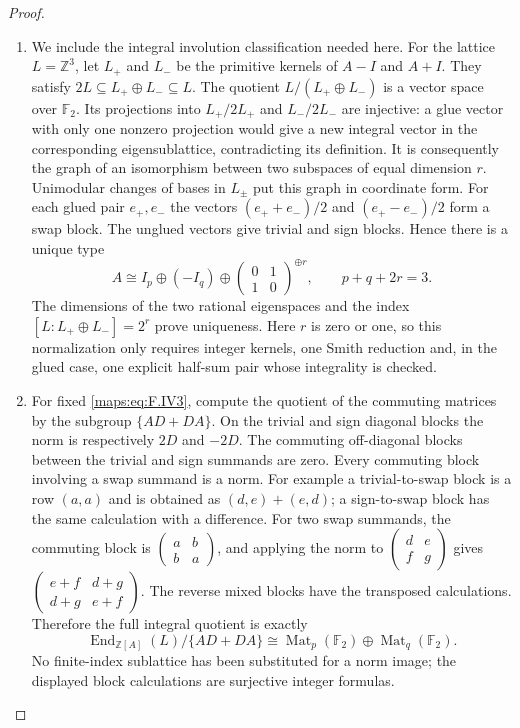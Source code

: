 \documentclass[11pt,a4paper]{article}
\theoremstyle{definition}
\begin{document}
\begin{proof}
\begin{enumerate}[label=\arabic*.]
\item We include the integral involution classification needed here.
For the lattice $L=\mathbb Z^3$, let $L_+$ and $L_-$ be the
primitive kernels of $A-I$ and $A+I$.  They satisfy
$2L\subseteq L_+\oplus L_-\subseteq L$.
The quotient $L/(L_+\oplus L_-)$ is a vector space over
$\mathbb F_2$.  Its projections into $L_+/2L_+$ and
$L_-/2L_-$ are injective: a glue vector with only one
nonzero projection would give a new integral vector in the
corresponding eigensublattice, contradicting its definition.
It is consequently the graph of an isomorphism between two
subspaces of equal dimension $r$.
Unimodular changes of bases in $L_\pm$ put this graph in
coordinate form.  For each glued pair $e_+,e_-$ the vectors
$(e_++e_-)/2$ and $(e_+-e_-)/2$ form a swap block.
The unglued vectors give trivial and sign blocks.  Hence
there is a unique type
\[
 A\cong I_p\oplus(-I_q)\oplus
 \begin{pmatrix}0&1\\1&0\end{pmatrix}^{\oplus r},
 \qquad p+q+2r=3.                                         \tag{F.IV3}\label{maps:eq:F.IV3}
\]
The dimensions of the two rational eigenspaces and the
index $[L:L_+\oplus L_-]=2^r$ prove uniqueness.
Here $r$ is zero or one, so this normalization only requires
integer kernels, one Smith reduction and, in the glued case,
one explicit half-sum pair whose integrality is checked.

\item For fixed \eqref{maps:eq:F.IV3}, compute the quotient of the commuting
matrices by the subgroup $\{AD+DA\}$.
On the trivial and sign diagonal blocks the norm is
respectively $2D$ and $-2D$.  The commuting off-diagonal
blocks between the trivial and sign summands are zero.
Every commuting block involving a swap summand is a norm.
For example a trivial-to-swap block is a row $(a,a)$ and
is obtained as $(d,e)+(e,d)$; a sign-to-swap block has the
same calculation with a difference.  For two swap summands,
the commuting block is
$\begin{pmatrix}a&b\\b&a\end{pmatrix}$, and applying the
norm to $\begin{pmatrix}d&e\\f&g\end{pmatrix}$ gives
$\begin{pmatrix}e+f&d+g\\d+g&e+f\end{pmatrix}$.
The reverse mixed blocks have the transposed calculations.
Therefore the full integral quotient is exactly
\[
 \operatorname{End}_{\mathbb Z[A]}(L)/\{AD+DA\}
 \cong \operatorname{Mat}_p(\mathbb F_2)
       \oplus\operatorname{Mat}_q(\mathbb F_2).             \tag{F.IV4}\label{maps:eq:F.IV4}
\]
No finite-index sublattice has been substituted for a norm
image; the displayed block calculations are surjective
integer formulas.


\end{enumerate}
\end{proof}
\end{document}
